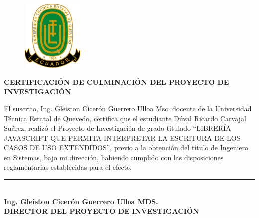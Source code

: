 \begin{center}
	\begin{figure}[htb]
		\begin{center}
			\includegraphics[width=3.04cm,height=3.39cm]{img/logoUTEQ.png}
		\end{center}
	\end{figure}
	
{\titulodc \textbf{CERTIFICACIÓN DE CULMINACIÓN DEL PROYECTO DE INVESTIGACIÓN}}

\end{center}
\vspace*{0.8in}
El suscrito, Ing. Gleiston Cicerón Guerrero Ulloa Msc. docente de la Universidad Técnica Estatal de Quevedo, certifica que el estudiante Dúval Ricardo Carvajal Suárez, realizó el Proyecto de Investigación de grado titulado “LIBRERÍA JAVASCRIPT QUE PERMITA INTERPRETAR LA ESCRITURA DE LOS CASOS DE USO EXTENDIDOS”, previo a la obtención del título de Ingeniero en Sistemas, bajo mi dirección, habiendo cumplido con las disposiciones reglamentarias establecidas para el efecto.

\begin{center}
	\vspace*{2in}
	\rule{8cm}{0.1mm} \\
	\textbf{Ing. Gleiston Cicerón Guerrero Ulloa MDS. \\
		DIRECTOR DEL PROYECTO DE INVESTIGACIÓN}
\end{center}